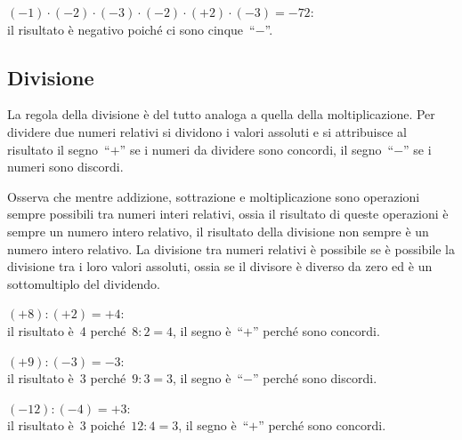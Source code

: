  \begin{esempio}
\((-1)\cdot (-2)\cdot (-3)\cdot (-2)\cdot (+2)\cdot (-3) = -72\): \\ 
il risultato è negativo poiché ci sono cinque~``\(-\)''.
 \end{esempio}


\subsection{Divisione}

La regola della divisione è del tutto analoga a quella della 
moltiplicazione.
Per dividere due numeri relativi si dividono i valori assoluti e si 
attribuisce
al risultato il segno~``\(+\)'' se i numeri da dividere sono concordi, il 
segno~``\(-\)'' se i numeri sono discordi.

Osserva che mentre addizione, sottrazione e moltiplicazione sono operazioni 
sempre possibili
tra numeri interi relativi, ossia il risultato di queste operazioni è 
sempre un 
numero intero
relativo, il risultato della divisione non sempre è un numero intero 
relativo. 
La divisione
tra numeri relativi è possibile se è possibile la divisione tra i loro 
valori 
assoluti, ossia se
il divisore è diverso da zero ed è un sottomultiplo del dividendo.
 \begin{esempio}
\((+8):(+2)=+4\): \\
il risultato è~4 perché~\(8:2=4\), il segno è~``\(+\)'' perché sono 
concordi.
 \end{esempio}

\begin{esempio}
\((+9):(-3)=-3\): \\ 
il risultato è~3 perché~\(9:3=3\), il segno è~``\(-\)'' perché sono 
discordi.
 \end{esempio}

\begin{esempio}
\((-12):(-4)=+3\): \\
il risultato è~3 poiché~\(12:4=3\), il segno è~``\(+\)'' perché sono 
concordi.
 \end{esempio}



